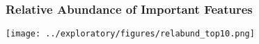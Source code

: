 \documentclass[
]{article}
\begin{document}
\hypertarget{relative-abundance-of-important-features}{%
\subsubsection{Relative Abundance of Important
Features}\label{relative-abundance-of-important-features}}

\texttt{[image: ../exploratory/figures/relabund\_top10.png]}
\end{document}
